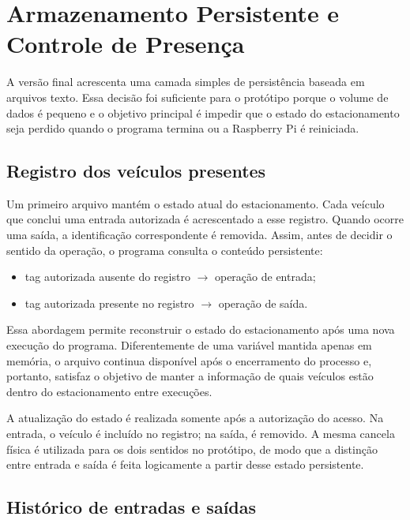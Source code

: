 \documentclass[11pt,a4paper]{article}
\begin{document}
\section{Armazenamento Persistente e Controle de Presença}

A versão final acrescenta uma camada simples de persistência baseada em arquivos
texto. Essa decisão foi suficiente para o protótipo porque o volume de dados é
pequeno e o objetivo principal é impedir que o estado do estacionamento seja
perdido quando o programa termina ou a Raspberry Pi é reiniciada.

\subsection{Registro dos veículos presentes}

Um primeiro arquivo mantém o estado atual do estacionamento. Cada veículo que
conclui uma entrada autorizada é acrescentado a esse registro. Quando ocorre uma
saída, a identificação correspondente é removida. Assim, antes de decidir o
sentido da operação, o programa consulta o conteúdo persistente:

\begin{itemize}[itemsep=1pt]
  \item tag autorizada ausente do registro $\rightarrow$ operação de entrada;
  \item tag autorizada presente no registro $\rightarrow$ operação de saída.
\end{itemize}

Essa abordagem permite reconstruir o estado do estacionamento após uma nova
execução do programa. Diferentemente de uma variável mantida apenas em memória,
o arquivo continua disponível após o encerramento do processo e, portanto,
satisfaz o objetivo de manter a informação de quais veículos estão dentro do
estacionamento entre execuções.

A atualização do estado é realizada somente após a autorização do acesso. Na
entrada, o veículo é incluído no registro; na saída, é removido. A mesma cancela
física é utilizada para os dois sentidos no protótipo, de modo que a distinção
entre entrada e saída é feita logicamente a partir desse estado persistente.

\subsection{Histórico de entradas e saídas}
\end{document}
